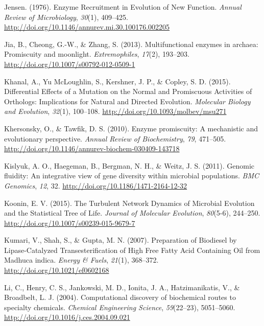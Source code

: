 \documentclass[12pt,twoside]{reedthesis}
\begin{document}
  \hypertarget{ref-jensenux5fenzymeux5f1976}{}
  Jensen. (1976). Enzyme Recruitment in Evolution of New Function.
  \emph{Annual Review of Microbiology}, \emph{30}(1), 409--425.
  \url{http://doi.org/10.1146/annurev.mi.30.100176.002205}
  
  \hypertarget{ref-jiaux5fmultifunctionalux5f2013}{}
  Jia, B., Cheong, G.-W., \& Zhang, S. (2013). Multifunctional enzymes in
  archaea: Promiscuity and moonlight. \emph{Extremophiles}, \emph{17}(2),
  193--203. \url{http://doi.org/10.1007/s00792-012-0509-1}
  
  \hypertarget{ref-khanalux5fdifferentialux5f2015}{}
  Khanal, A., Yu McLoughlin, S., Kershner, J. P., \& Copley, S. D. (2015).
  Differential Effects of a Mutation on the Normal and Promiscuous
  Activities of Orthologs: Implications for Natural and Directed
  Evolution. \emph{Molecular Biology and Evolution}, \emph{32}(1),
  100--108. \url{http://doi.org/10.1093/molbev/msu271}
  
  \hypertarget{ref-khersonskyux5fenzymeux5f2010}{}
  Khersonsky, O., \& Tawfik, D. S. (2010). Enzyme promiscuity: A
  mechanistic and evolutionary perspective. \emph{Annual Review of
  Biochemistry}, \emph{79}, 471--505.
  \url{http://doi.org/10.1146/annurev-biochem-030409-143718}
  
  \hypertarget{ref-kislyukux5fgenomicux5f2011}{}
  Kislyuk, A. O., Haegeman, B., Bergman, N. H., \& Weitz, J. S. (2011).
  Genomic fluidity: An integrative view of gene diversity within microbial
  populations. \emph{BMC Genomics}, \emph{12}, 32.
  \url{http://doi.org/10.1186/1471-2164-12-32}
  
  \hypertarget{ref-kooninux5fturbulentux5f2015}{}
  Koonin, E. V. (2015). The Turbulent Network Dynamics of Microbial
  Evolution and the Statistical Tree of Life. \emph{Journal of Molecular
  Evolution}, \emph{80}(5-6), 244--250.
  \url{http://doi.org/10.1007/s00239-015-9679-7}
  
  \hypertarget{ref-kumariux5fpreparationux5f2007}{}
  Kumari, V., Shah, S., \& Gupta, M. N. (2007). Preparation of Biodiesel
  by Lipase-Catalyzed Transesterification of High Free Fatty Acid
  Containing Oil from Madhuca indica. \emph{Energy \& Fuels},
  \emph{21}(1), 368--372. \url{http://doi.org/10.1021/ef0602168}
  
  \hypertarget{ref-liux5fcomputationalux5f2004}{}
  Li, C., Henry, C. S., Jankowski, M. D., Ionita, J. A., Hatzimanikatis,
  V., \& Broadbelt, L. J. (2004). Computational discovery of biochemical
  routes to specialty chemicals. \emph{Chemical Engineering Science},
  \emph{59}(22--23), 5051--5060.
  \url{http://doi.org/10.1016/j.ces.2004.09.021}
  
\end{document}
